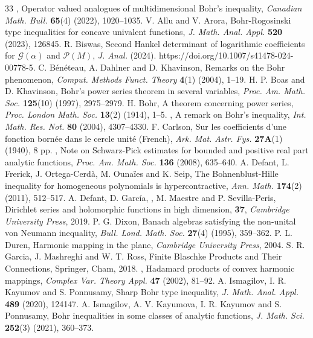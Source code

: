 \documentclass[11pt,reqno]{amsart}
\newtheorem{open problem}{Open problem}[section]
\numberwithin{equation}{section}
\begin{document}
\begin{thebibliography}{33}
, Operator valued analogues of multidimensional Bohr's inequality, {\it Canadian Math. Bull.} {\bf65}(4) (2022), 1020--1035.
 {\sc V. Allu and V. Arora}, Bohr-Rogosinski type inequalities for concave univalent functions, {\it J. Math. Anal. Appl.} {\bf520} (2023), 126845.
 {\sc R. Biswas}, Second Hankel determinant of logarithmic coefficients for $\mathcal{G}(\alpha)$ and $\mathcal{P}(M)$, {\it J. Anal.} (2024). https://doi.org/10.1007/s41478-024-00778-5.
 {\sc C. B\'en\'eteau, A. Dahlner and D. Khavinson}, Remarks on the Bohr phenomenon, {\it Comput. Methods Funct. Theory} {\bf4}(1) (2004), 1--19.
 {\sc H. P. Boas and D. Khavinson}, Bohr's power series theorem in several variables, {\it Proc. Am. Math. Soc.} {\bf125}(10) (1997), 2975--2979.
 {\sc H. Bohr}, A theorem concerning power series, {\it Proc. London Math. Soc.} {\bf13}(2) (1914), 1--5.
, A remark on Bohr's inequality, {\it Int. Math. Res. Not.} {\bf80} (2004), 4307--4330.
 {\sc F. Carlson}, Sur les coefficients d'une fonction born\'ee dans le cercle unit\'e (French), {\it Ark. Mat. Astr. Fys.} {\bf 27A}(1) (1940), 8 pp.
, Note on Schwarz-Pick estimates for bounded and positive real part analytic functions, {\it Proc. Am. Math. Soc.} {\bf136} (2008), 635--640.
 {\sc A. Defant, L. Frerick, J. Ortega-Cerd\`a, M. Ouna\"ies and K. Seip}, The Bohnenblust-Hille inequality for homogeneous polynomials is hypercontractive, {\it Ann. Math.} {\bf174}(2) (2011), 512--517.
 {\sc A. Defant, D. Garc\'ia, , M. Maestre and P. Sevilla-Peris}, Dirichlet series and holomorphic functions in high dimension, {\bf 37}, {\it Cambridge University Press}, 2019.
 {\sc P. G. Dixon}, Banach algebras satisfying the non-unital von Neumann inequality, {\it Bull. Lond. Math. Soc.} {\bf27}(4) (1995), 359--362.
 {\sc P. L. Duren}, Harmonic mapping in the plane, {\it Cambridge University Press}, 2004.
 {\sc S. R. Garcia, J. Mashreghi and W. T. Ross}, Finite Blaschke Products and Their Connections, Springer, Cham, 2018.
, Hadamard products of convex harmonic mappings, {\it Complex Var. Theory Appl.} {\bf47} (2002), 81--92. 
 {\sc A. Ismagilov, I. R. Kayumov and S. Ponnusamy}, Sharp Bohr type inequality, {\it J. Math. Anal. Appl.} {\bf489} (2020), 124147.
 {\sc A. Ismagilov, A. V. Kayumova, I. R. Kayumov and S. Ponnusamy}, Bohr inequalities in some classes of analytic functions, {\it J. Math. Sci.} {\bf252}(3) (2021), 360--373.

\end{thebibliography}
\end{document}
